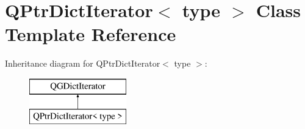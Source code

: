 \hypertarget{class_q_ptr_dict_iterator}{}\section{Q\+Ptr\+Dict\+Iterator$<$ type $>$ Class Template Reference}
\label{class_q_ptr_dict_iterator}
Inheritance diagram for Q\+Ptr\+Dict\+Iterator$<$ type $>$\+:\begin{figure}[H]
\begin{center}
\leavevmode
\includegraphics[height=2.000000cm]{class_q_ptr_dict_iterator}
\end{center}
\end{figure}
